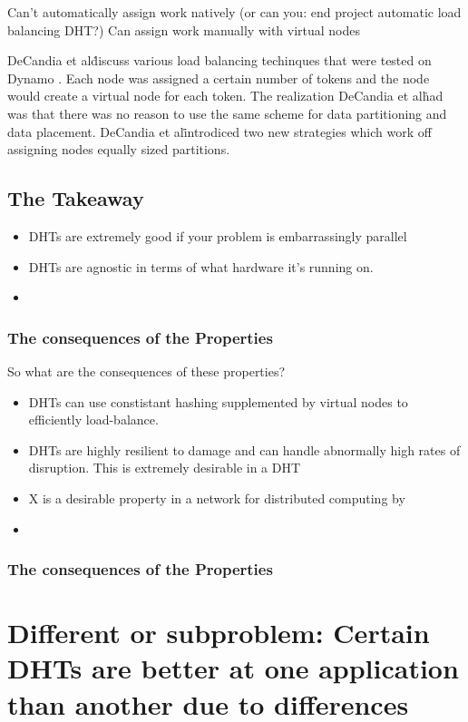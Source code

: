 \documentclass[10pt,letterpaper]{report}
\begin{document}
Can't automatically assign work natively (or can you: end project automatic load balancing DHT?)
Can assign work manually with virtual nodes 


DeCandia et al\. discuss various load balancing techinques that were tested on Dynamo \cite{dynamo}.  
Each node was assigned a certain number of tokens and the node would create a virtual node for each token.
The realization DeCandia et al\. had was that there was no reason to use the same scheme for data partitioning and data placement.
DeCandia et al\. introdiced two new strategies which work off assigning nodes equally sized partitions.


\subsection{The Takeaway}


\begin{itemize}
	\item DHTs are extremely good if your problem is embarrassingly parallel
	\item DHTs are agnostic in terms of what hardware it's running on.
	\item
\end{itemize}
\subsubsection{The consequences of the Properties}
So what are the consequences of these properties?
\begin{itemize}
    \item DHTs can use constistant hashing supplemented by virtual nodes to efficiently load-balance.
	\item DHTs are highly resilient to damage and can handle abnormally high rates of disruption.  This is extremely desirable in a DHT
	\item X is a desirable property in a network for distributed computing by
	\item 
\end{itemize}


\subsubsection{The consequences of the Properties}


\section{Different or subproblem: Certain DHTs are better at one application than another due to differences}
\end{document}

